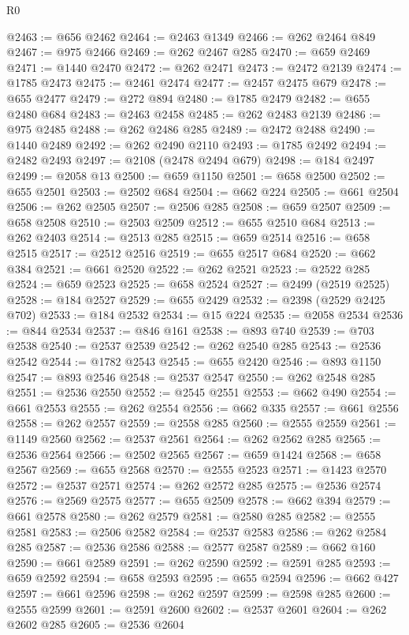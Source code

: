 \begin{lexlean}{R0}
\begin{coremodule}
@2463 := @656 @2462
@2464 := @2463 @1349
@2466 := @262 @2464 @849
@2467 := @975 @2466
@2469 := @262 @2467 @285
@2470 := @659 @2469
@2471 := @1440 @2470
@2472 := @262 @2471
@2473 := @2472 @2139
@2474 := @1785 @2473
@2475 := @2461 @2474
@2477 := @2457 @2475 @679
@2478 := @655 @2477
@2479 := @272 @894
@2480 := @1785 @2479
@2482 := @655 @2480 @684
@2483 := @2463 @2458
@2485 := @262 @2483 @2139
@2486 := @975 @2485
@2488 := @262 @2486 @285
@2489 := @2472 @2488
@2490 := @1440 @2489
@2492 := @262 @2490 @2110
@2493 := @1785 @2492
@2494 := @2482 @2493
@2497 := @2108 (@2478 @2494 @679)
@2498 := @184 @2497
@2499 := @2058 @13
@2500 := @659 @1150
@2501 := @658 @2500
@2502 := @655 @2501
@2503 := @2502 @684
@2504 := @662 @224
@2505 := @661 @2504
@2506 := @262 @2505
@2507 := @2506 @285
@2508 := @659 @2507
@2509 := @658 @2508
@2510 := @2503 @2509
@2512 := @655 @2510 @684
@2513 := @262 @2403
@2514 := @2513 @285
@2515 := @659 @2514
@2516 := @658 @2515
@2517 := @2512 @2516
@2519 := @655 @2517 @684
@2520 := @662 @384
@2521 := @661 @2520
@2522 := @262 @2521
@2523 := @2522 @285
@2524 := @659 @2523
@2525 := @658 @2524
@2527 := @2499 (@2519 @2525)
@2528 := @184 @2527
@2529 := @655 @2429
@2532 := @2398 (@2529 @2425 @702)
@2533 := @184 @2532
@2534 := @15 @224
@2535 := @2058 @2534
@2536 := @844 @2534
@2537 := @846 @161
@2538 := @893 @740
@2539 := @703 @2538
@2540 := @2537 @2539
@2542 := @262 @2540 @285
@2543 := @2536 @2542
@2544 := @1782 @2543
@2545 := @655 @2420
@2546 := @893 @1150
@2547 := @893 @2546
@2548 := @2537 @2547
@2550 := @262 @2548 @285
@2551 := @2536 @2550
@2552 := @2545 @2551
@2553 := @662 @490
@2554 := @661 @2553
@2555 := @262 @2554
@2556 := @662 @335
@2557 := @661 @2556
@2558 := @262 @2557
@2559 := @2558 @285
@2560 := @2555 @2559
@2561 := @1149 @2560
@2562 := @2537 @2561
@2564 := @262 @2562 @285
@2565 := @2536 @2564
@2566 := @2502 @2565
@2567 := @659 @1424
@2568 := @658 @2567
@2569 := @655 @2568
@2570 := @2555 @2523
@2571 := @1423 @2570
@2572 := @2537 @2571
@2574 := @262 @2572 @285
@2575 := @2536 @2574
@2576 := @2569 @2575
@2577 := @655 @2509
@2578 := @662 @394
@2579 := @661 @2578
@2580 := @262 @2579
@2581 := @2580 @285
@2582 := @2555 @2581
@2583 := @2506 @2582
@2584 := @2537 @2583
@2586 := @262 @2584 @285
@2587 := @2536 @2586
@2588 := @2577 @2587
@2589 := @662 @160
@2590 := @661 @2589
@2591 := @262 @2590
@2592 := @2591 @285
@2593 := @659 @2592
@2594 := @658 @2593
@2595 := @655 @2594
@2596 := @662 @427
@2597 := @661 @2596
@2598 := @262 @2597
@2599 := @2598 @285
@2600 := @2555 @2599
@2601 := @2591 @2600
@2602 := @2537 @2601
@2604 := @262 @2602 @285
@2605 := @2536 @2604

\end{coremodule}
\end{lexlean}
